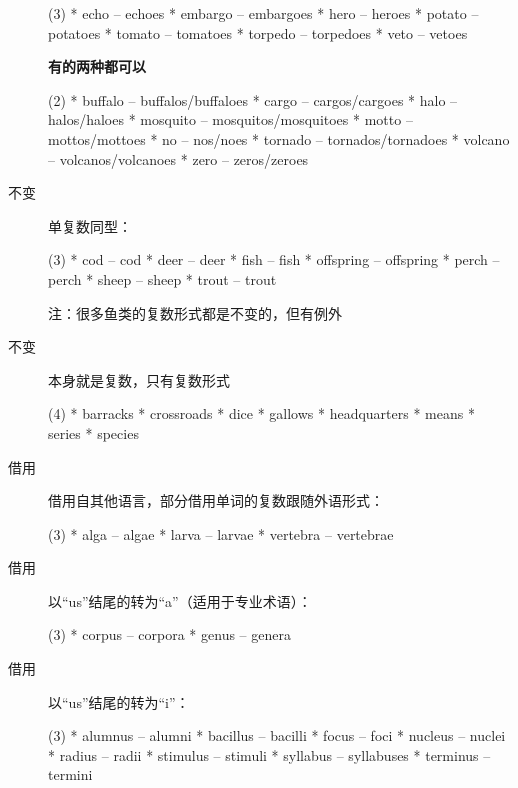 \begin{description}
  \begin{taskitem}(3)
    *  echo -- echoes
    *  embargo -- embargoes
    *  hero -- heroes
    *  potato -- potatoes
    *  tomato -- tomatoes
    *  torpedo -- torpedoes
    *  veto -- vetoes
  \end{taskitem}

  \textbf{有的两种都可以}
  \begin{taskitem}(2)
    *  buffalo -- buffalos/buffaloes
    *  cargo -- cargos/cargoes
    *  halo -- halos/haloes
    *  mosquito -- mosquitos/mosquitoes
    *  motto -- mottos/mottoes
    *  no -- nos/noes
    *  tornado -- tornados/tornadoes
    *  volcano -- volcanos/volcanoes
    *  zero -- zeros/zeroes
  \end{taskitem}

\item [不变] 单复数同型：
  \begin{taskitem}(3)
    *  cod -- cod
    *  deer -- deer
    *  fish -- fish
    *  offspring -- offspring
    *  perch -- perch
    *  sheep -- sheep
    *  trout -- trout
  \end{taskitem}

  注：很多鱼类的复数形式都是不变的，但有例外

\item[不变] 本身就是复数，只有复数形式
  \begin{taskitem}(4)
    *  barracks
    *  crossroads
    *  dice
    *  gallows
    *  headquarters
    *  means
    *  series
    *  species
  \end{taskitem}

\item[借用] 借用自其他语言，部分借用单词的复数跟随外语形式：
  \begin{taskitem}(3)
    *  alga -- algae
    *  larva -- larvae
    *  vertebra -- vertebrae
  \end{taskitem}

\item[借用] 以``us''结尾的转为``a''（适用于专业术语）：
  \begin{taskitem}(3)
    *  corpus -- corpora
    *  genus -- genera
  \end{taskitem}

\item[借用] 以``us''结尾的转为``i''：
  \begin{taskitem}(3)
    *  alumnus -- alumni
    *  bacillus -- bacilli
    *  focus -- foci
    *  nucleus -- nuclei
    *  radius -- radii
    *  stimulus -- stimuli
    *  syllabus -- syllabuses
    *  terminus -- termini
  \end{taskitem}


\end{description}
